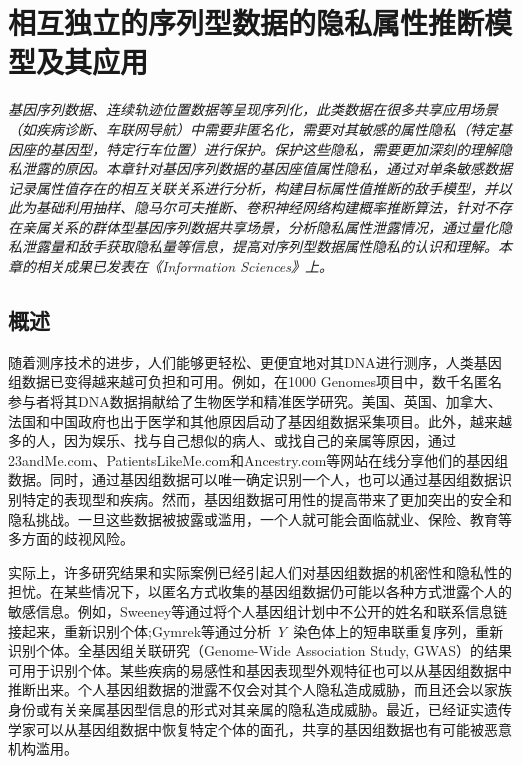 \chapter{相互独立的序列型数据的隐私属性推断模型及其应用}
\label{chap:inference-attack-on-norelated-sequenced-data}

\textit{ }

\textit{基因序列数据、连续轨迹位置数据等呈现序列化，此类数据在很多共享应用场景（如疾病诊断、车联网导航）中需要非匿名化，需要对其敏感的属性隐私（特定基因座的基因型，特定行车位置）进行保护。保护这些隐私，需要更加深刻的理解隐私泄露的原因。本章针对基因序列数据的基因座值属性隐私，通过对单条敏感数据记录属性值存在的相互关联关系进行分析，构建目标属性值推断的敌手模型，并以此为基础利用抽样、隐马尔可夫推断、卷积神经网络构建概率推断算法，针对不存在亲属关系的群体型基因序列数据共享场景，分析隐私属性泄露情况，通过量化隐私泄露量和敌手获取隐私量等信息，提高对序列型数据属性隐私的认识和理解。本章的相关成果已发表在《Information Sciences》上。
}

\section{概述}\label{sec:intro}

随着测序技术的进步，人们能够更轻松、更便宜地对其DNA进行测序，人类基因组数据已变得越来越可负担和可用。例如，在1000 Genomes项目\cite{gpc2015global}中，数千名匿名参与者将其DNA数据捐献给了生物医学和精准医学研究。美国、英国、加拿大、法国和中国政府也出于医学和其他原因启动了基因组数据采集项目。此外，越来越多的人，因为娱乐、找与自己想似的病人、或找自己的亲属等原因，通过23andMe.com、PatientsLikeMe.com和Ancestry.com等网站在线分享他们的基因组数据。同时，通过基因组数据可以唯一确定识别一个人，也可以通过基因组数据识别特定的表现型和疾病。然而，基因组数据可用性的提高带来了更加突出的安全和隐私挑战。一旦这些数据被披露或滥用，一个人就可能会面临就业、保险、教育等多方面的歧视风险\cite{eeoc2008genetic}。

实际上，许多研究结果和实际案例已经引起人们对基因组数据的机密性和隐私性的担忧。在某些情况下，以匿名方式收集的基因组数据仍可能以各种方式泄露个人的敏感信息。例如，Sweeney等\cite{sweeney2013identifying}通过将个人基因组计划中不公开的姓名和联系信息链接起来，重新识别个体;Gymrek等\cite{gymrek2013identifying}通过分析~$Y$~染色体上的短串联重复序列，重新识别个体。全基因组关联研究（Genome-Wide Association Study, GWAS）的结果可用于识别个体\cite{cai2015deterministic}。某些疾病的易感性\cite{shringarpure2015privacy}和基因表现型外观特征\cite{walsh2011irisplex}也可以从基因组数据中推断出来。个人基因组数据的泄露不仅会对其个人隐私造成威胁，而且还会以家族身份\cite{rohlfs2012familial}或有关亲属基因型信息的形式对其亲属的隐私造成威胁\cite{humbert2013addressing}。最近，已经证实遗传学家可以从基因组数据中恢复特定个体的面孔\cite{hess2017controversial}，共享的基因组数据也有可能被恶意机构滥用\cite{scutti2018what}。

